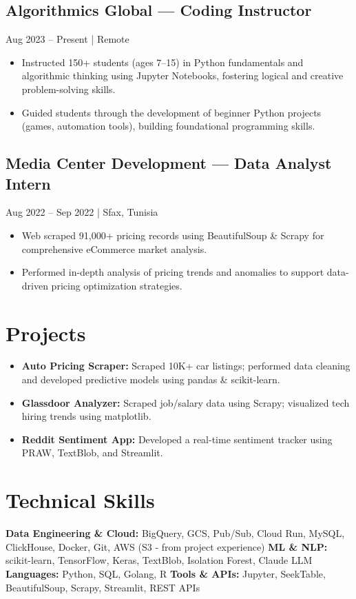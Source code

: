 \documentclass[11pt]{article}
\begin{document}
\subsection*{Algorithmics Global — Coding Instructor}
Aug 2023 – Present | Remote

\begin{itemize}
    \item Instructed 150+ students (ages 7–15) in Python fundamentals and algorithmic thinking using Jupyter Notebooks, fostering logical and creative problem-solving skills.
    \item Guided students through the development of beginner Python projects (games, automation tools), building foundational programming skills.
\end{itemize}

\subsection*{Media Center Development — Data Analyst Intern}
Aug 2022 – Sep 2022 | Sfax, Tunisia

\begin{itemize}
    \item Web scraped 91,000+ pricing records using BeautifulSoup & Scrapy for comprehensive eCommerce market analysis.
    \item Performed in-depth analysis of pricing trends and anomalies to support data-driven pricing optimization strategies.
\end{itemize}

\section*{Projects}
\begin{itemize}
    \item \textbf{Auto Pricing Scraper:} Scraped 10K+ car listings; performed data cleaning and developed predictive models using pandas & scikit-learn.
    \item \textbf{Glassdoor Analyzer:} Scraped job/salary data using Scrapy; visualized tech hiring trends using matplotlib.
    \item \textbf{Reddit Sentiment App:} Developed a real-time sentiment tracker using PRAW, TextBlob, and Streamlit.
\end{itemize}

\section*{Technical Skills}
\textbf{Data Engineering \& Cloud:} BigQuery, GCS, Pub/Sub, Cloud Run, MySQL, ClickHouse, Docker, Git, AWS (S3 - from project experience)
\textbf{ML \& NLP:} scikit-learn, TensorFlow, Keras, TextBlob, Isolation Forest, Claude LLM
\textbf{Languages:} Python, SQL, Golang, R
\textbf{Tools \& APIs:} Jupyter, SeekTable, BeautifulSoup, Scrapy, Streamlit, REST APIs
\end{document}

